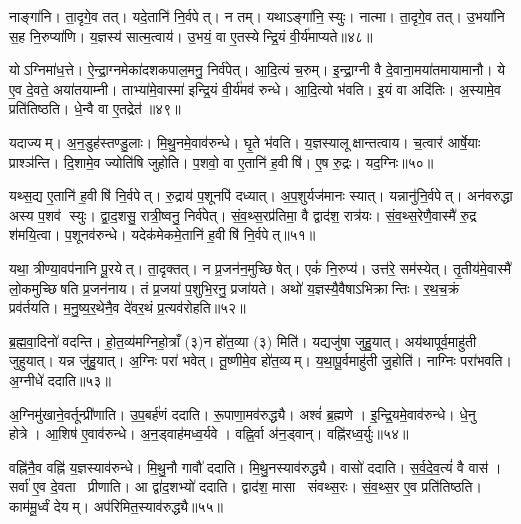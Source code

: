 नाङ्गा॑नि। ता॒दृगे॒व तत्। यदे॒तानि॑ नि॒र्वपेत्। न तम्। यथाऽङ्गा॑नि॒ स्युः। नात्मा। ता॒दृगे॒व तत्। उ॒भया॑नि स॒ह नि॒रुप्या॑णि। य॒ज्ञस्य॑ सात्म॒त्वाय॑। उ॒भयं॒ वा ए॒तस्येन्द्रि॒यं वी॒र्य॑माप्यते॥४८॥

योऽग्निमा॑ध॒त्ते। ऐ॒न्द्रा॒ग्नमेका॑दशकपाल॒मनु॒ निर्व॑पेत्। आ॒दि॒त्यं च॒रुम्। इ॒न्द्रा॒ग्नी वै दे॒वाना॒मया॑तमायामानौ। ये ए॒व दे॒वते॒ अया॑तयाम्नी। ताभ्या॑मे॒वास्मा॑ इन्द्रि॒यं वी॒र्य॑मव॑ रुन्धे। आ॒दि॒त्यो भ॑वति। इ॒यं वा अदि॑तिः। अ॒स्यामे॒व प्रति॑तिष्ठति। धे॒न्वै वा ए॒तद्रेत॑॥४९॥

यदाज्यम्। अ॒न॒डुह॑स्तण्डु॒लाः। मि॒थु॒नमे॒वाव॑रुन्धे। घृ॒ते भ॑वति। य॒ज्ञस्यालूक्षान्तत्वाय। च॒त्वार॑ आर्\mbox{}षे॒याः प्राश्ञ॑न्ति। दि॒शामे॒व ज्योति॑षि जुहोति। प॒शवो॒ वा ए॒तानि॑ ह॒वीषि॑। ए॒ष रु॒द्रः। यद॒ग्निः॥५०॥

यथ्स॒द्य ए॒तानि॑ ह॒वीषि॑ नि॒र्वपेत्। रु॒द्राय॑ प॒शूनपि॑ दध्यात्। अ॒प॒शुर्यज॑मानः स्यात्। यन्नानु॑नि॒र्वपेत्। अन॑वरुद्धा अस्य प॒शव॑ स्युः। द्वा॒द॒शसु॒ रात्री॒ष्वनु॒ निर्व॑पेत्। सं॒व॒थ्स॒रप्र॑तिमा॒ वै द्वाद॑श॒ रात्र॑यः। सं॒व॒थ्स॒रेणै॒वास्मै॑ रु॒द्र श॑मयि॒त्वा। प॒शूनव॑रुन्धे। यदेक॑मेकमे॒तानि॑ ह॒वीषि॑ नि॒र्वपेत्॥५१॥

यथा॒ त्रीण्या॒वप॑नानि पू॒रयेत्। ता॒दृक्तत्। न प्र॒जन॑न॒मुच्छिषेत्। एकं॑ नि॒रुप्य॑। उत्त॑रे॒ सम॑स्येत्। तृ॒तीय॑मे॒वास्मै॑ लो॒कमुच्छिषति प्र॒जन॑नाय। तं प्र॒जया॑ प॒शुभि॒रनु॒ प्रजा॑यते। अथो॑ य॒ज्ञस्यै॒वैषाऽभिक्रान्तिः। र॒थ॒च॒क्रं प्रव॑र्तयति। म॒नु॒ष्य॒र॒थेनै॒व दे॑वर॒थं प्र॒त्यव॑रोहति॥५२॥

ब्र॒ह्म॒वा॒दिनो॑ वदन्ति। हो॒त॒व्य॑मग्निहो॒त्राँ (३)न हो॑त॒व्या (३) मिति॑। यद्यजु॑षा जुहु॒यात्। अय॑थापूर्व॒माहु॑ती जुहुयात्। यन्न जु॑हु॒यात्। अ॒ग्निः परा॑ भवेत्। तू॒ष्णीमे॒व हो॑त॒व्यम्। य॒था॒पू॒र्वमाहु॑ती जु॒होति॑। नाग्निः परा॑भवति। अ॒ग्नीधे॑ ददाति॥५३॥

अ॒ग्निमु॑खाने॒वर्तून्प्री॑णाति। उ॒प॒बर्\mbox{}ह॑णं ददाति। रू॒पाणा॒मव॑रुद्ध्यै। अश्वं॑ ब्र॒ह्मणे। इ॒न्द्रि॒यमे॒वाव॑रुन्धे। धे॒नु होत्रे। आ॒शिष॑ ए॒वाव॑रुन्धे। अ॒न॒ड्वाह॑मध्व॒र्यवे। वह्नि॒र्वा अ॑न॒ड्वान्। वह्नि॑रध्व॒र्युः॥५४॥

वह्नि॑नै॒व वह्नि॑ य॒ज्ञस्याव॑रुन्धे। मि॒थु॒नौ गावौ॑ ददाति। मि॒थु॒नस्याव॑रुद्ध्यै। वासो॑ ददाति। स॒र्व॒दे॒व॒त्यं॑ वै वास॑। सर्वा॑ ए॒व दे॒वता प्रीणाति। आ द्वा॑द॒शभ्यो॑ ददाति। द्वाद॑श॒ मासा संवथ्स॒रः। सं॒व॒थ्स॒र ए॒व प्रति॑तिष्ठति। काम॑मू॒र्ध्वं देयम्। अप॑रिमित॒स्याव॑रुद्ध्यै॥५५॥\anuvakamend[आ॒दि॒त्ये तृती॑यम॒फ्स्वासी॒त्तत्तेनावा॑रुन्धत॒ स्यादाप्यते॒ रेतो॒ऽग्निरेक॑मेकमे॒तानि॑ ह॒वीषि॑ नि॒र्वपेत्प्र॒त्यव॑रोहति ददात्यध्व॒र्युर्देय॒मेकं॑ च]

